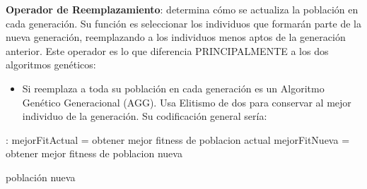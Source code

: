 \textbf{Operador de Reemplazamiento}: determina cómo se actualiza la población en cada generación. Su función es seleccionar los individuos que formarán parte de la nueva generación, reemplazando a los individuos menos aptos de la generación anterior. Este operador es lo que diferencia PRINCIPALMENTE a los dos algoritmos genéticos: 
\begin{itemize}
\item Si reemplaza a toda su población en cada generación es un Algoritmo Genético Generacional (AGG). Usa Elitismo de dos para conservar al mejor individuo de la generación. Su codificación general sería:
\end{itemize}


\begin{algorithm}[H]
	
	
	\BlankLine
	:
	\BlankLine
	mejorFitActual = obtener mejor fitness de poblacion actual
	mejorFitNueva = obtener mejor fitness de poblacion nueva
	
	\BlankLine
	\Return población nueva\;
\end{algorithm}
\quad\\

